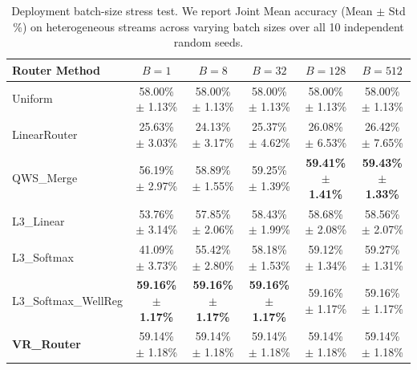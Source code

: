 \begin{table}[t]
\caption{Deployment batch-size stress test. We report Joint Mean accuracy (Mean $\pm$ Std \%) on heterogeneous streams across varying batch sizes over all 10 independent random seeds.}
\label{tab:stress_test}
\vskip 0.15in
\begin{center}
\begin{small}
\begin{sc}
\setlength{\tabcolsep}{8pt}
\begin{tabular}{lccccc}
\toprule
Router Method & $B=1$ & $B=8$ & $B=32$ & $B=128$ & $B=512$ \\
\midrule
Uniform       & 58.00\% $\pm$ 1.13\% & 58.00\% $\pm$ 1.13\% & 58.00\% $\pm$ 1.13\% & 58.00\% $\pm$ 1.13\% & 58.00\% $\pm$ 1.13\% \\
LinearRouter  & 25.63\% $\pm$ 3.03\% & 24.13\% $\pm$ 3.17\% & 25.37\% $\pm$ 4.62\% & 26.08\% $\pm$ 6.53\% & 26.42\% $\pm$ 7.65\% \\
QWS\_Merge    & 56.19\% $\pm$ 2.97\% & 58.89\% $\pm$ 1.55\% & 59.25\% $\pm$ 1.39\% & \textbf{59.41\% $\pm$ 1.41\%} & \textbf{59.43\% $\pm$ 1.33\%} \\
L3\_Linear    & 53.76\% $\pm$ 3.14\% & 57.85\% $\pm$ 2.06\% & 58.43\% $\pm$ 1.99\% & 58.68\% $\pm$ 2.08\% & 58.56\% $\pm$ 2.07\% \\
L3\_Softmax   & 41.09\% $\pm$ 3.73\% & 55.42\% $\pm$ 2.80\% & 58.18\% $\pm$ 1.53\% & 59.12\% $\pm$ 1.34\% & 59.27\% $\pm$ 1.31\% \\
L3\_Softmax\_WellReg & \textbf{59.16\% $\pm$ 1.17\%} & \textbf{59.16\% $\pm$ 1.17\%} & \textbf{59.16\% $\pm$ 1.17\%} & 59.16\% $\pm$ 1.17\% & 59.16\% $\pm$ 1.17\% \\
\midrule
\textbf{VR\_Router} & 59.14\% $\pm$ 1.18\% & 59.14\% $\pm$ 1.18\% & 59.14\% $\pm$ 1.18\% & 59.14\% $\pm$ 1.18\% & 59.14\% $\pm$ 1.18\% \\
\bottomrule
\end{tabular}
\end{sc}
\end{small}
\end{center}
\vskip -0.1in
\end{table}

